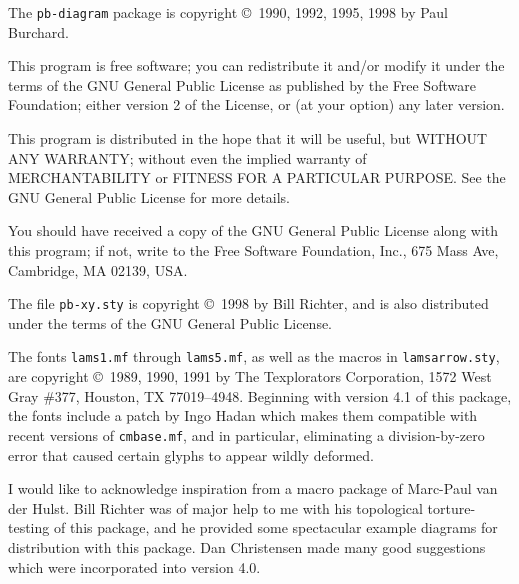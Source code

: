 \documentclass[12pt]{article}\usepackage{pb-diagram}
\begin{document}
The \verb"pb-diagram" package is
copyright \copyright\ 1990, 1992, 1995, 1998 by Paul Burchard.

This program is free software; you can redistribute it and/or modify
it under the terms of the GNU General Public License as published by
the Free Software Foundation; either version 2 of the License, or
(at your option) any later version.

This program is distributed in the hope that it will be useful,
but WITHOUT ANY WARRANTY; without even the implied warranty of
MERCHANTABILITY or FITNESS FOR A PARTICULAR PURPOSE.  See the
GNU General Public License for more details.

You should have received a copy of the GNU General Public License
along with this program; if not, write to the Free Software
Foundation, Inc., 675 Mass Ave, Cambridge, MA 02139, USA.

The file \verb"pb-xy.sty" is
copyright \copyright\ 1998 by Bill Richter,
and is also distributed under the terms of the GNU General Public License.

The fonts \verb"lams1.mf" through \verb"lams5.mf", as well as the
macros in \verb"lamsarrow.sty", are copyright \copyright\ 1989,
1990, 1991 by The Texplorators Corporation, 1572 West Gray \#377,
Houston, TX 77019--4948.  Beginning with version 4.1 of this package,
the fonts include a patch by Ingo Hadan which makes them compatible
with recent versions of \verb"cmbase.mf", and in particular, eliminating
a division-by-zero error that caused certain glyphs to appear wildly deformed.

I would like to acknowledge inspiration from a macro package of 
Marc-Paul van der Hulst.  Bill Richter was of major help to me with 
his topological torture-testing of this package, and he provided
some spectacular example diagrams for distribution with this package.
Dan Christensen made many good suggestions which were incorporated
into version 4.0.
\end{document}
